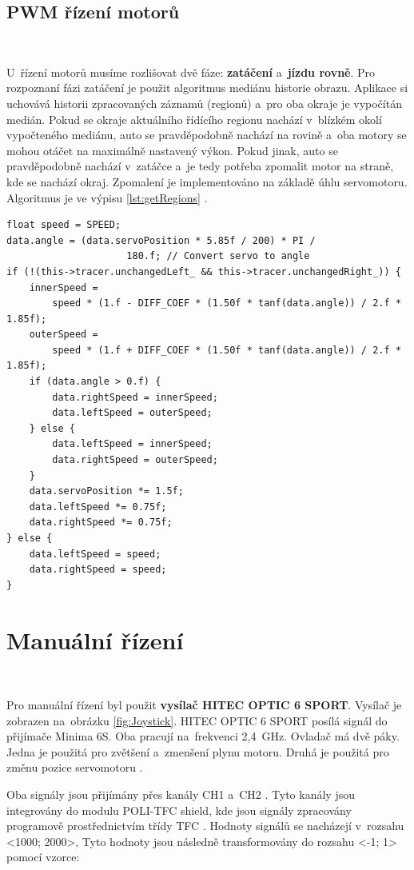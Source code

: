 \subsection{PWM řízení motorů}\

U~řízení motorů musíme rozlišovat dvě fáze: \textbf{zatáčení} a~\textbf{jízdu
rovně}. Pro rozpoznaní fázi zatáčení je použit algoritmus mediánu historie obrazu.
Aplikace si uchovává historii zpracovaných záznamů (regionů) a~pro oba okraje je
vypočítán medián. Pokud se okraje aktuálního řídícího regionu nachází v~blízkém
okolí vypočteného mediánu, auto se pravděpodobně nachází na rovině a~oba motory se
mohou otáčet na maximálně nastavený výkon. Pokud jinak, auto se pravděpodobně
nachází v~zatáčce a~je tedy potřeba zpomalit motor na straně, kde se nachází okraj.
Zpomalení je implementováno na základě úhlu servomotoru. Algoritmus je ve výpisu 
\ref{lst:getRegions} \cite{robot}.

\begin{lstlisting}[caption = Algoritmus kontroly PWM motorů\cite{robot}, label = lst:controlPWM]
float speed = SPEED;
data.angle = (data.servoPosition * 5.85f / 200) * PI /
	                 180.f; // Convert servo to angle
if (!(this->tracer.unchangedLeft_ && this->tracer.unchangedRight_)) {
    innerSpeed =
        speed * (1.f - DIFF_COEF * (1.50f * tanf(data.angle)) / 2.f * 1.85f);
    outerSpeed =
        speed * (1.f + DIFF_COEF * (1.50f * tanf(data.angle)) / 2.f * 1.85f);
    if (data.angle > 0.f) {
        data.rightSpeed = innerSpeed;
        data.leftSpeed = outerSpeed;
    } else {
        data.leftSpeed = innerSpeed;
        data.rightSpeed = outerSpeed;
    }
    data.servoPosition *= 1.5f;
    data.leftSpeed *= 0.75f;
    data.rightSpeed *= 0.75f;
} else {
    data.leftSpeed = speed;
    data.rightSpeed = speed;
}
\end{lstlisting}

\section{Manuální řízení}\

Pro manuální řízení byl použit \textbf{vysílač HITEC OPTIC 6 SPORT}.
Vysílač je zobrazen na~obrázku \ref{fig:Joystick}. HITEC OPTIC 6 SPORT 
posílá signál do přijímače Minima 6S. Oba pracují na~frekvenci 2,4~GHz. 
Ovladač má dvě páky. Jedna je použitá pro zvětšení a~zmenšení
plynu motoru. Druhá je použitá pro změnu pozice servomotoru \cite{RC}.

Oba signály jsou přijímány přes kanály CH1 a~CH2 \cite{RC}. Tyto kanály jsou
integrovány do modulu POLI-TFC shield, kde jsou signály zpracovány programově
prostřednictvím třídy TFC \cite{draha}. Hodnoty signálů se nacházejí v~rozsahu
<1000; 2000>, Tyto hodnoty jsou následně transformovány do rozsahu <-1; 1> pomocí 
vzorce:

